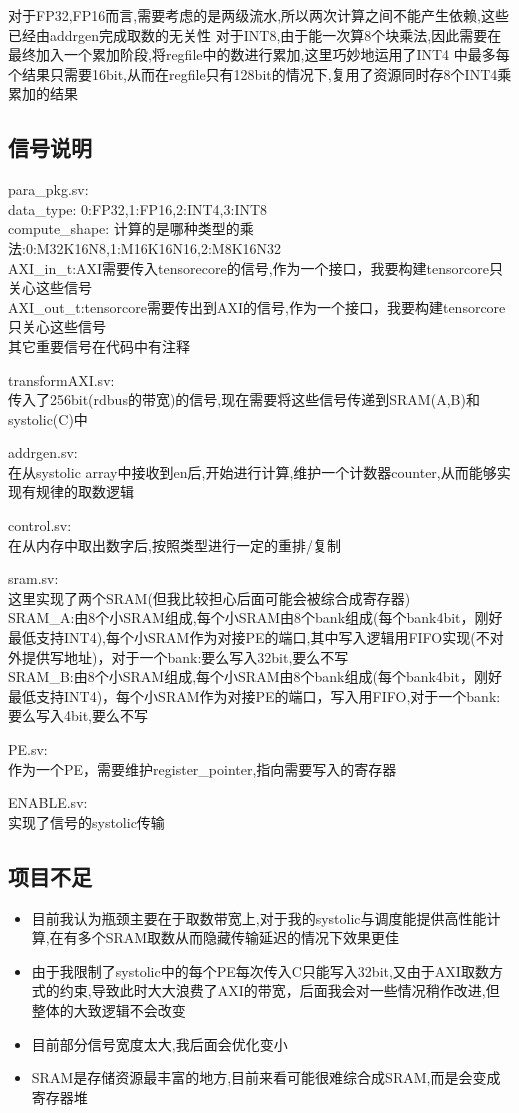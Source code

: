 \documentclass[zihao=-4, UTF8]{ctexart}
\begin{document}
对于FP32,FP16而言,需要考虑的是两级流水,所以两次计算之间不能产生依赖,这些已经由addrgen完成取数的无关性
对于INT8,由于能一次算8个块乘法,因此需要在最终加入一个累加阶段,将regfile中的数进行累加,这里巧妙地运用了INT4
中最多每个结果只需要16bit,从而在regfile只有128bit的情况下,复用了资源同时存8个INT4乘累加的结果

\subsection{信号说明}
para\_pkg.sv:\\
data\_type: 0:FP32,1:FP16,2:INT4,3:INT8\\
compute\_shape: 计算的是哪种类型的乘法:0:M32K16N8,1:M16K16N16,2:M8K16N32\\
AXI\_in\_t:AXI需要传入tensorecore的信号,作为一个接口，我要构建tensorcore只关心这些信号\\
AXI\_out\_t:tensorcore需要传出到AXI的信号,作为一个接口，我要构建tensorcore只关心这些信号\\
其它重要信号在代码中有注释

transformAXI.sv:\\
传入了256bit(rdbus的带宽)的信号,现在需要将这些信号传递到SRAM(A,B)和systolic(C)中

addrgen.sv:\\
在从systolic array中接收到en后,开始进行计算,维护一个计数器counter,从而能够实现有规律的取数逻辑

control.sv:\\
在从内存中取出数字后,按照类型进行一定的重排/复制

sram.sv:\\
这里实现了两个SRAM(但我比较担心后面可能会被综合成寄存器)\\
SRAM\_A:由8个小SRAM组成,每个小SRAM由8个bank组成(每个bank4bit，刚好最低支持INT4),每个小SRAM作为对接PE的端口,其中写入逻辑用FIFO实现(不对外提供写地址)，对于一个bank:要么写入32bit,要么不写\\
SRAM\_B:由8个小SRAM组成,每个小SRAM由8个bank组成(每个bank4bit，刚好最低支持INT4)，每个小SRAM作为对接PE的端口，写入用FIFO,对于一个bank:要么写入4bit,要么不写

PE.sv:\\
作为一个PE，需要维护register\_pointer,指向需要写入的寄存器

ENABLE.sv:\\
实现了信号的systolic传输

\subsection{项目不足}
\begin{itemize}
    \item 目前我认为瓶颈主要在于取数带宽上,对于我的systolic与调度能提供高性能计算,在有多个SRAM取数从而隐藏传输延迟的情况下效果更佳
    \item 由于我限制了systolic中的每个PE每次传入C只能写入32bit,又由于AXI取数方式的约束,导致此时大大浪费了AXI的带宽，后面我会对一些情况稍作改进,但整体的大致逻辑不会改变
    \item 目前部分信号宽度太大,我后面会优化变小
    \item SRAM是存储资源最丰富的地方,目前来看可能很难综合成SRAM,而是会变成寄存器堆
\end{itemize}
\end{document}
